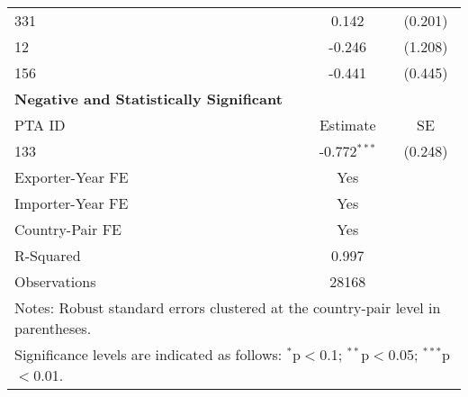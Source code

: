 \begin{table}[htbp]
\begin{adjustbox}{max width=\textwidth}
\begin{tabular}{lcc}
    331 & 0.142 & (0.201) \\
    12  & -0.246 & (1.208) \\
    156 & -0.441 & (0.445) \\
    \hline
    \textbf{Negative and Statistically Significant} &  &  \\
    \hline
    PTA ID & Estimate & SE \\
    \hline
    133 & -0.772$^{\ast\ast\ast}$ & (0.248) \\
    \hline
    Exporter-Year FE & Yes \\
    Importer-Year FE & Yes \\
    Country-Pair FE & Yes \\
    R-Squared & 0.997 \\
    Observations & 28168 \\
    \hline
    \multicolumn{3}{l}{\footnotesize{Notes: Robust standard errors clustered at the country-pair level in parentheses.}} \\
    \multicolumn{3}{l}{\footnotesize{Significance levels are indicated as follows: $^{\ast}$p$<$0.1; $^{\ast\ast}$p$<$0.05; $^{\ast\ast\ast}$p$<$0.01.}} \\
    \end{tabular}
    \end{adjustbox} 
\end{table}
